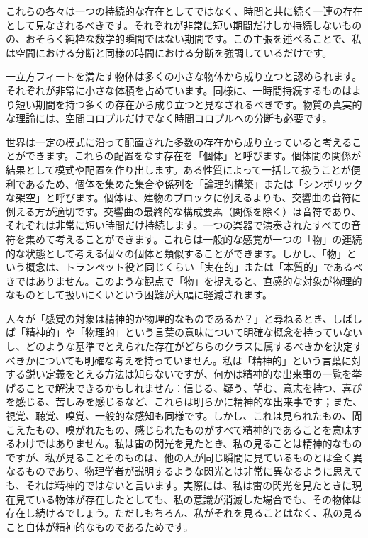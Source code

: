 \documentclass[a4paper,11pt,openany]{ltjsbook}
\begin{document}
これらの各々は一つの持続的な存在としてではなく、時間と共に続く一連の存在として見なされるべきです。それぞれが非常に短い期間だけしか持続しないものの、おそらく純粋な数学的瞬間ではない期間です。この主張を述べることで、私は空間における分断と同様の時間における分断を強調しているだけです。

一立方フィートを満たす物体は多くの小さな物体から成り立つと認められます。それぞれが非常に小さな体積を占めています。同様に、一時間持続するものはより短い期間を持つ多くの存在から成り立つと見なされるべきです。物質の真実的な理論には、空間コロプルだけでなく時間コロプルへの分断も必要です。

世界は一定の模式に沿って配置された多数の存在から成り立っていると考えることができます。これらの配置をなす存在を「個体」と呼びます。個体間の関係が結果として模式や配置を作り出します。ある性質によって一括して扱うことが便利であるため、個体を集めた集合や係列を「論理的構築」または「シンボリックな架空」と呼びます。個体は、建物のブロックに例えるよりも、交響曲の音符に例える方が適切です。交響曲の最終的な構成要素（関係を除く）は音符であり、それぞれは非常に短い時間だけ持続します。一つの楽器で演奏されたすべての音符を集めて考えることができます。これらは一般的な感覚が一つの「物」の連続的な状態として考える個々の個体と類似することができます。しかし、「物」という概念は、トランペット役と同じくらい「実在的」または「本質的」であるべきではありません。このような観点で「物」を捉えると、直感的な対象が物理的なものとして扱いにくいという困難が大幅に軽減されます。

人々が「感覚の対象は精神的か物理的なものであるか？」と尋ねるとき、しばしば「精神的」や「物理的」という言葉の意味について明確な概念を持っていないし、どのような基準でとえられた存在がどちらのクラスに属するべきかを決定すべきかについても明確な考えを持っていません。私は「精神的」という言葉に対する鋭い定義をとえる方法は知らないですが、何かは精神的な出来事の一覧を挙げることで解決できるかもしれません：信じる、疑う、望む、意志を持つ、喜びを感じる、苦しみを感じるなど、これらは明らかに精神的な出来事です；また、視覚、聴覚、嗅覚、一般的な感知も同様です。しかし、これは見られたもの、聞こえたもの、嗅がれたもの、感じられたものがすべて精神的であることを意味するわけではありません。私は雷の閃光を見たとき、私の見ることは精神的なものですが、私が見ることそのものは、他の人が同じ瞬間に見ているものとは全く異なるものであり、物理学者が説明するような閃光とは非常に異なるように思えても、それは精神的ではないと言います。実際には、私は雷の閃光を見たときに現在見ている物体が存在したとしても、私の意識が消滅した場合でも、その物体は存在し続けるでしょう。ただしもちろん、私がそれを見ることはなく、私の見ること自体が精神的なものであるためです。
\end{document}
